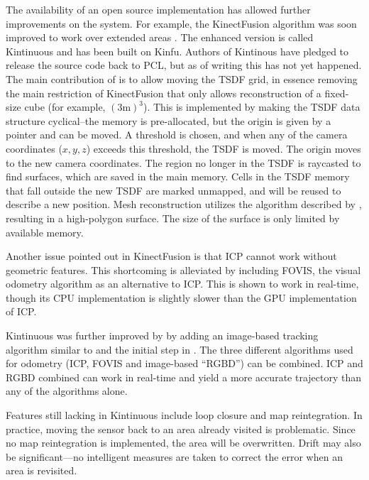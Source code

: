 The availability of an open source implementation has allowed further improvements on the system. For example, the KinectFusion algorithm was soon improved to work over extended areas \citep{Whelan12rssw}. The enhanced version is called Kintinuous and has been built on Kinfu. Authors of Kintinous have pledged to release the source code back to PCL, but as of writing this has not yet happened. The main contribution of \citet{Whelan12rssw} is to allow moving the TSDF grid, in essence removing the main restriction of KinectFusion that only allows reconstruction of a fixed-size cube (for example, $(3 \mathrm{m})^3$). This is implemented by making the TSDF data structure cyclical--the memory is pre-allocated, but the origin is given by a pointer and can be moved. A threshold is chosen, and when any of the camera coordinates ($x, y, z$) exceeds this threshold, the TSDF is moved. The origin moves to the new camera coordinates. The region no longer in the TSDF is raycasted to find surfaces, which are saved in the main memory. Cells in the TSDF memory that fall outside the new TSDF are marked unmapped, and will be reused to describe a new position. Mesh reconstruction utilizes the algorithm described by \citet{Marton09ICRA}, resulting in a high-polygon surface. The size of the surface is only limited by available memory. \citep{Whelan12rssw}

Another issue pointed out in KinectFusion is that ICP cannot work without geometric features. This shortcoming is alleviated by including FOVIS, the visual odometry algorithm as an alternative to ICP. This is shown to work in real-time, though its CPU implementation is slightly slower than the GPU implementation of ICP. \citep{Whelan12rssw}

Kintinuous was further improved by \citet{Whelan12tr} by adding an image-based tracking algorithm similar to \citep{tykkala2011direct} and the initial step in \citep{huang2011visual}. The three different algorithms used for odometry (ICP, FOVIS and image-based ``RGBD'') can be combined. ICP and RGBD combined can work in real-time and yield a more accurate trajectory than any of the algorithms alone. \citep{Whelan12tr}

Features still lacking in Kintinuous include loop closure and map reintegration. In practice, moving the sensor back to an area already visited is problematic. Since no map reintegration is implemented, the area will be overwritten. Drift may also be significant---no intelligent measures are taken to correct the error when an area is revisited.

